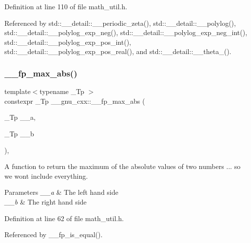 Definition at line 110 of file math\+\_\+util.\+h.



Referenced by std\+::\+\_\+\+\_\+detail\+::\+\_\+\+\_\+periodic\+\_\+zeta(), std\+::\+\_\+\+\_\+detail\+::\+\_\+\+\_\+polylog(), std\+::\+\_\+\+\_\+detail\+::\+\_\+\+\_\+polylog\+\_\+exp\+\_\+neg(), std\+::\+\_\+\+\_\+detail\+::\+\_\+\+\_\+polylog\+\_\+exp\+\_\+neg\+\_\+int(), std\+::\+\_\+\+\_\+detail\+::\+\_\+\+\_\+polylog\+\_\+exp\+\_\+pos\+\_\+int(), std\+::\+\_\+\+\_\+detail\+::\+\_\+\+\_\+polylog\+\_\+exp\+\_\+pos\+\_\+real(), and std\+::\+\_\+\+\_\+detail\+::\+\_\+\+\_\+theta\+\_().

\mbox{\label{namespace____gnu__cxx_a85d72dd4ca7056d3a5979d03251ec38a}} 
\subsubsection{\texorpdfstring{\+\_\+\+\_\+fp\+\_\+max\+\_\+abs()}{\_\_fp\_max\_abs()}}
{\footnotesize\ttfamily template$<$typename \+\_\+\+Tp $>$ \\
constexpr \+\_\+\+Tp \+\_\+\+\_\+gnu\+\_\+cxx\+::\+\_\+\+\_\+fp\+\_\+max\+\_\+abs (\begin{DoxyParamCaption}\item[{\+\_\+\+Tp}]{\+\_\+\+\_\+a,  }\item[{\+\_\+\+Tp}]{\+\_\+\+\_\+b }\end{DoxyParamCaption})\hspace{0.3cm}{\ttfamily [inline]}, {\ttfamily [noexcept]}}

A function to return the maximum of the absolute values of two numbers ... so we won\textquotesingle{}t include everything. 
\begin{DoxyParams}{Parameters}
{\em \+\_\+\+\_\+a} & The left hand side \\
\hline
{\em \+\_\+\+\_\+b} & The right hand side \\
\hline
\end{DoxyParams}


Definition at line 62 of file math\+\_\+util.\+h.



Referenced by \+\_\+\+\_\+fp\+\_\+is\+\_\+equal().

